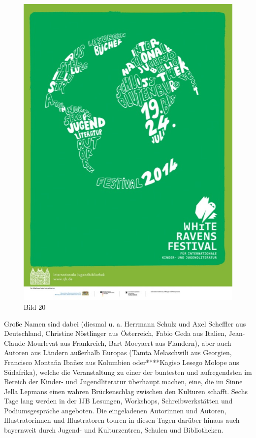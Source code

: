 \documentclass[a4paper,
fontsize=11pt,
oneside,
numbers=noperiodatend,
parskip=half-,
bibliography=totoc,
final
]{scrartcl}
\begin{document}
\begin{figure}[htbp]
\centering
\includegraphics{img/Bild20.jpg}
\caption{Bild 20}
\end{figure}

Große Namen sind dabei (diesmal u. a. Herrmann Schulz und Axel Scheffler
aus Deutschland, Christine Nöstlinger aus Österreich, Fabio Geda aus
Italien, Jean-Claude Mourlevat aus Frankreich, Bart Moeyaert aus
Flandern), aber auch Autoren aus Ländern außerhalb Europas (Tamta
Melaschwili aus Georgien, Francisco Montaňa Ibaňez aus Kolumbien
oder****Kagiso Lesego Molope aus Südafrika), welche die Veranstaltung zu
einer der buntesten und aufregendsten im Bereich der Kinder- und
Jugendliteratur überhaupt machen, eine, die im Sinne Jella Lepmans einen
wahren Brückenschlag zwischen den Kulturen schafft. Sechs Tage lang
werden in der IJB Lesungen, Workshops, Schreibwerkstätten und
Podiumsgespräche angeboten. Die eingeladenen Autorinnen und Autoren,
Illustratorinnen und Illustratoren touren in diesen Tagen darüber hinaus
auch bayernweit durch Jugend- und Kulturzentren, Schulen und
Bibliotheken.
\end{document}
